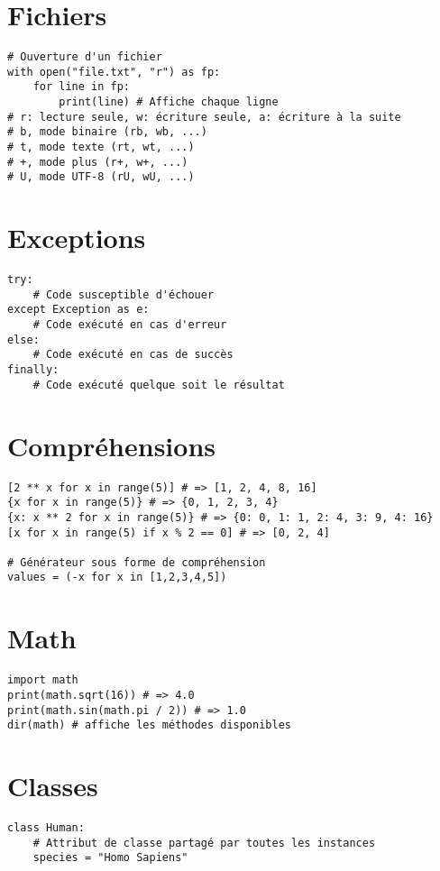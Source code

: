 \documentclass{article}
\begin{document}
\begin{multicols*}{4}
\section*{Fichiers}
\begin{lstlisting}
# Ouverture d'un fichier
with open("file.txt", "r") as fp:
    for line in fp:
        print(line) # Affiche chaque ligne
# r: lecture seule, w: écriture seule, a: écriture à la suite
# b, mode binaire (rb, wb, ...)
# t, mode texte (rt, wt, ...)
# +, mode plus (r+, w+, ...)
# U, mode UTF-8 (rU, wU, ...)
\end{lstlisting}

\section*{Exceptions}
\begin{lstlisting}
try: 
    # Code susceptible d'échouer
except Exception as e: 
    # Code exécuté en cas d'erreur
else: 
    # Code exécuté en cas de succès
finally: 
    # Code exécuté quelque soit le résultat
\end{lstlisting}

\section*{Compréhensions}
\begin{lstlisting}
[2 ** x for x in range(5)] # => [1, 2, 4, 8, 16]
{x for x in range(5)} # => {0, 1, 2, 3, 4}
{x: x ** 2 for x in range(5)} # => {0: 0, 1: 1, 2: 4, 3: 9, 4: 16}
[x for x in range(5) if x % 2 == 0] # => [0, 2, 4]

# Générateur sous forme de compréhension      
values = (-x for x in [1,2,3,4,5])
\end{lstlisting}

\section*{Math}
\begin{lstlisting}
import math
print(math.sqrt(16)) # => 4.0
print(math.sin(math.pi / 2)) # => 1.0
dir(math) # affiche les méthodes disponibles
\end{lstlisting}

\section*{Classes}
\begin{lstlisting}
class Human:   
    # Attribut de classe partagé par toutes les instances
    species = "Homo Sapiens" 


\end{lstlisting}
\end{multicols*}
\end{document}
